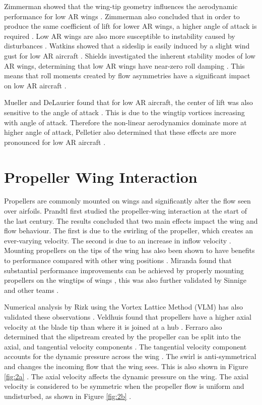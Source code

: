  Zimmerman showed that the wing-tip geometry influences the aerodynamic performance for low \acrshort{AR} wings \cite{Zimmerman1936}. Zimmerman also concluded that in order to produce the same coefficient of lift for lower \acrshort{AR} wings, a higher angle of attack is required \cite{Zimmerman1936}. Low \acrshort{AR} wings are also more susceptible to instability caused by disturbances \cite{DeVoria2017}. Watkins showed that a sideslip is easily induced by a slight wind gust for low \acrshort{AR} aircraft \cite{Watkins2012}. Shields investigated the inherent stability modes of low \acrshort{AR} wings, determining that low \acrshort{AR} wings have near-zero roll damping \cite{Shields2015}. This means that roll moments created by flow asymmetries have a significant impact on low \acrshort{AR} aircraft \cite{Shields2015}.
 
 Mueller and DeLaurier found that for low \acrshort{AR} aircraft, the center of lift was also sensitive to the angle of attack \cite{Mueller2003}. This is due to the wingtip vortices increasing with angle of attack. Therefore the non-linear aerodynamics dominate more at higher angle of attack, Pelletier also determined that these effects are more pronounced for low \acrshort{AR} aircraft \cite{Pelletier2012}. 


\section{Propeller Wing Interaction}\label{sec:propellerWingInteraction}

Propellers are commonly mounted on wings and significantly alter the flow seen over airfoils. Prandtl first studied the propeller-wing interaction at the start of the last century. The results concluded that two main effects impact the wing and flow behaviour. The first is due to the swirling of the propeller, which creates an ever-varying velocity. The second is due to an increase in inflow velocity \cite{Pant}. Mounting propellers on the tips of the wing has also been shown to have benefits to performance compared with other wing positions \cite{Miranda1986}. Miranda found that substantial performance improvements can be achieved by properly mounting propellers on the wingtips of wings \cite{Miranda1986}, this was also further validated by Sinnige \cite{Sinnige2019} and other teams \cite{Veldhuis2000} \cite{review}. 

Numerical analysis by Rizk using the Vortex Lattice Method (\acrshort{VLM}) has also validated these observations \cite{Rizk2012}. Veldhuis found that propellers have a higher axial velocity at the blade tip than where it is joined at a hub \cite{Veldhuis2000}. Ferraro also determined that the slipstream created by the propeller can be split into the axial, and tangential velocity components \cite{Ferraro2014}. The tangential velocity component accounts for the dynamic pressure across the wing \cite{Ferraro2014}. The swirl is anti-symmetrical and changes the incoming flow that the wing sees. This is also shown in Figure \ref{fig:2a} \cite{Ferraro2014}. The axial velocity affects the dynamic pressure on the wing. The axial velocity is considered to be symmetric when the propeller flow is uniform and undisturbed, as shown in Figure \ref{fig:2b} \cite{Ferraro2014}.



